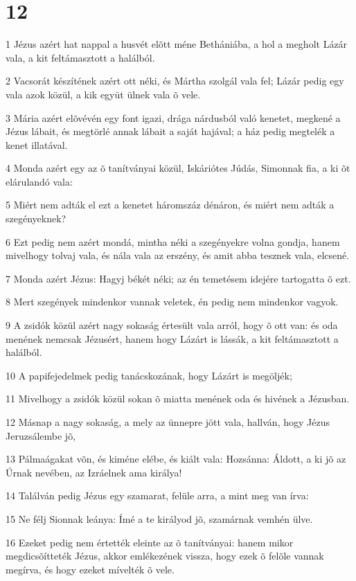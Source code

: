 \chapter{12}

\par 1 Jézus azért hat nappal a husvét elõtt méne Bethániába, a hol a megholt Lázár vala, a kit feltámasztott a halálból.
\par 2 Vacsorát készítének azért ott néki, és Mártha szolgál vala fel; Lázár pedig egy vala azok közül, a kik együt ülnek vala õ vele.
\par 3 Mária azért elõvévén egy font igazi, drága nárdusból való kenetet, megkené a Jézus lábait, és megtörlé annak lábait a saját hajával; a ház pedig megtelék a kenet illatával.
\par 4 Monda azért egy az õ tanítványai közül, Iskáriótes Júdás, Simonnak fia, a ki õt elárulandó vala:
\par 5 Miért nem adták el ezt a kenetet háromszáz dénáron, és miért nem adták a szegényeknek?
\par 6 Ezt pedig nem azért mondá, mintha néki a szegényekre volna gondja, hanem mivelhogy tolvaj vala, és nála vala az erszény, és amit abba tesznek vala, elcsené.
\par 7 Monda azért Jézus: Hagyj békét néki; az én temetésem idejére tartogatta õ ezt.
\par 8 Mert szegények mindenkor vannak veletek, én pedig nem mindenkor vagyok.
\par 9 A zsidók közül azért nagy sokaság értesült vala arról, hogy õ ott van: és oda menének nemcsak Jézusért, hanem hogy Lázárt is lássák, a kit feltámasztott a halálból.
\par 10 A papifejedelmek pedig tanácskozának, hogy Lázárt is megöljék;
\par 11 Mivelhogy a zsidók közül sokan õ miatta menének oda és hivének a Jézusban.
\par 12 Másnap a nagy sokaság, a mely az ünnepre jött vala, hallván, hogy Jézus Jeruzsálembe jõ,
\par 13 Pálmaágakat võn, és kiméne elébe, és kiált vala: Hozsánna: Áldott, a ki jõ az Úrnak nevében, az Izráelnek ama királya!
\par 14 Találván pedig Jézus egy szamarat, felüle arra, a mint meg van írva:
\par 15 Ne félj Sionnak leánya: Ímé a te királyod jõ, szamárnak vemhén ülve.
\par 16 Ezeket pedig nem értették eleinte az õ tanítványai: hanem mikor megdicsõítteték Jézus, akkor emlékezének vissza, hogy ezek õ felõle vannak megírva, és hogy ezeket mívelték õ vele.
